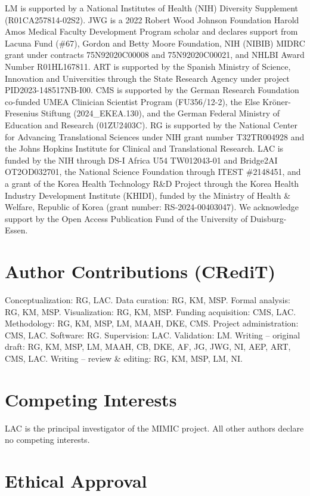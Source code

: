 \documentclass[11pt]{article}
\begin{document}
LM is supported by a National Institutes of Health (NIH) Diversity Supplement (R01CA257814-02S2). JWG is a 2022 Robert Wood Johnson Foundation Harold Amos Medical Faculty Development Program scholar and declares support from Lacuna Fund (\#67), Gordon and Betty Moore Foundation, NIH (NIBIB) MIDRC grant under contracts 75N92020C00008 and 75N92020C00021, and NHLBI Award Number R01HL167811. ART is supported by the Spanish Ministry of Science, Innovation and Universities through the State Research Agency under project PID2023-148517NB-I00. CMS is supported by the German Research Foundation co-funded UMEA Clinician Scientist Program (FU356/12-2), the Else Kr\"oner-Fresenius Stiftung (2024\_EKEA.130), and the German Federal Ministry of Education and Research (01ZU2403C). RG is supported by the National Center for Advancing Translational Sciences under NIH grant number T32TR004928 and the Johns Hopkins Institute for Clinical and Translational Research. LAC is funded by the NIH through DS-I Africa U54 TW012043-01 and Bridge2AI OT2OD032701, the National Science Foundation through ITEST \#2148451, and a grant of the Korea Health Technology R\&D Project through the Korea Health Industry Development Institute (KHIDI), funded by the Ministry of Health \& Welfare, Republic of Korea (grant number: RS-2024-00403047). We acknowledge support by the Open Access Publication Fund of the University of Duisburg-Essen.

\section*{Author Contributions (CRediT)}

Conceptualization: RG, LAC.
Data curation: RG, KM, MSP.
Formal analysis: RG, KM, MSP.
Visualization: RG, KM, MSP.
Funding acquisition: CMS, LAC.
Methodology: RG, KM, MSP, LM, MAAH, DKE, CMS.
Project administration: CMS, LAC.
Software: RG.
Supervision: LAC.
Validation: LM.
Writing -- original draft: RG, KM, MSP, LM, MAAH, CB, DKE, AF, JG, JWG, NI, AEP, ART, CMS, LAC.
Writing -- review \& editing: RG, KM, MSP, LM, NI.

\section*{Competing Interests}

LAC is the principal investigator of the MIMIC project. All other authors declare no competing interests.

\section*{Ethical Approval}
\end{document}

